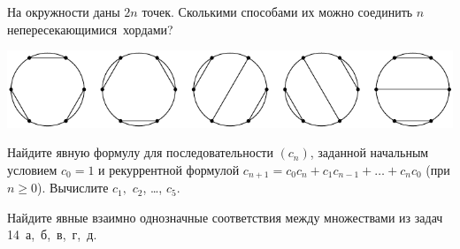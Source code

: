 \documentclass[a4paper,12pt]{article}\usepackage{newlistok}
\begin{document}
На окружности даны $2n$ точек.
Сколькими способами их можно соединить $n$ непересекающимися~\hbox{хордами?}

\centerline{\includegraphics{cat-3}}

 Найдите явную формулу для последовательности $(c_n)$, заданной
начальным условием
$c_0=1$
и рекуррентной формулой $c_{n+1}=c_0c_{n}+c_1c_{n-1}+\ldots+c_{n}c_0$
(при $n\geq0$). Вычислите $c_1,$ $c_2$, \dots, $c_5$.



Найдите явные взаимно однозначные соответствия между множествами из задач
14~а,~б,~в,~г,~д.



\vfill
{}

\end{document}

